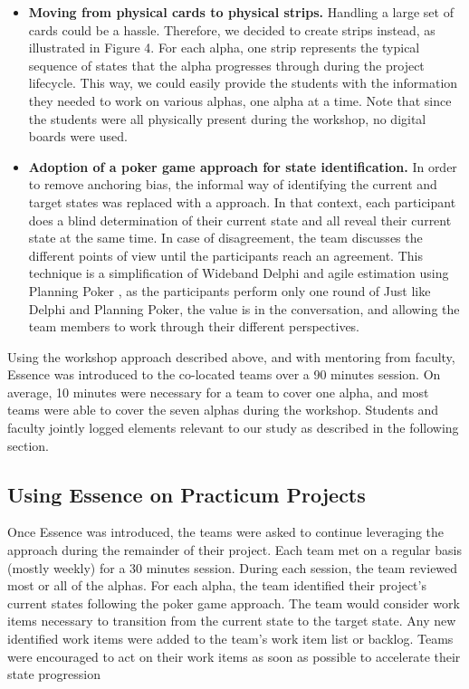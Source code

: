 \begin{itemize}
    \item \textbf{Moving from physical cards to physical strips.} Handling a large set of cards could be a hassle. Therefore, we decided to create strips instead, as illustrated in Figure 4. For each alpha, one strip represents the typical sequence of states that the alpha progresses through during the project lifecycle. This way, we could easily provide the students with the information they needed to work on various alphas, one alpha at a time. Note that since the students were all physically present during the workshop, no digital boards were used.
    
    \item \textbf{Adoption of a poker game approach for state identification.} In order to remove anchoring bias, the informal way of identifying the current and target states was replaced with a  approach. In that context, each participant does a blind determination of their current state and all reveal their current state at the same time. In case of disagreement, the team discusses the different points of view until the participants reach an agreement. This technique is a simplification of Wideband Delphi \cite{StellmanAppliedPM} and agile estimation using Planning Poker \cite{GrenningPlanningPoker}, as the participants perform only one round of  Just like Delphi and Planning Poker, the value is in the conversation, and allowing the team members to work through their different perspectives.
\end{itemize}

Using the workshop approach described above, and with mentoring from faculty, Essence was introduced to the co-located teams over a 90 minutes session. On average, 10 minutes were necessary for a team to cover one alpha, and most teams were able to cover the seven alphas during the workshop. Students and faculty jointly logged elements relevant to our study as described in the following section.

\subsection{Using Essence on Practicum Projects}

Once Essence was introduced, the teams were asked to continue leveraging the approach during the remainder of their project. Each team met on a regular basis (mostly weekly) for a 30 minutes session. During each session, the team reviewed most or all of the alphas. For each alpha, the team identified their project's current states following the poker game approach. The team would consider work items necessary to transition from the current state to the target state. Any new identified work items were added to the team's work item list or backlog. Teams were encouraged to act on their work items as soon as possible to accelerate their state progression

